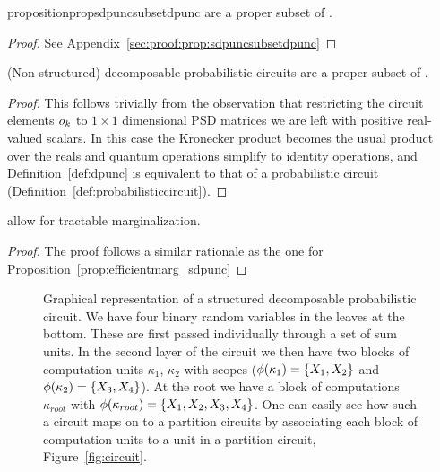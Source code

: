 \begin{restatable}{proposition}{propsdpuncsubsetdpunc}
	\label{prop:sdpuncsubsetdpunc}
	\sdpuncs are a proper subset of \dpuncs.
\end{restatable}

\begin{proof}
	See Appendix~\ref{sec:proof:prop:sdpuncsubsetdpunc}
\end{proof}





\begin{proposition}
	(Non-structured) decomposable probabilistic circuits are a proper subset of \dpuncs.
\end{proposition}

\begin{proof}
	This follows trivially from the observation that restricting the circuit elements $o_k$ to  $1{\times}1$ dimensional PSD matrices we are left with positive real-valued scalars. In this case the Kronecker product becomes the usual product over the reals and quantum operations simplify to identity operations, and Definition~\ref{def:dpunc} is equivalent to that of a probabilistic circuit (Definition~\ref{def:probabilisticcircuit}).
\end{proof}

\begin{proposition}
	\dpuncs allow for tractable marginalization.
\end{proposition}

\begin{proof}
	The proof follows a similar rationale as the one for Proposition~\ref{prop:efficientmarg_sdpunc}
\end{proof}




\begin{figure}
	\centering

	
	\caption{
		Graphical representation of a structured decomposable probabilistic circuit. We have four binary random variables in the leaves at the bottom. These are first passed individually through a set of sum units. In the second layer of the circuit we then have two blocks of computation units $\kappa_1$, $\kappa_2$ with scopes ($\phi(\kappa_1)= \{ X_1, X_2  \}$ and $\phi(\kappa_2)= \{ X_3, X_4  \}$). At the root we have a block of computations $\kappa_{root}$ with $\phi(\kappa_{root}) = \{ X_1, X_2, X_3, X_4 \}$. One can easily see how such a circuit maps on to a partition circuits by associating each block of computation units to a unit in a partition circuit, \cf Figure~\ref{fig:circuit}.
	}
	\label{fig:sdcircuit}
\end{figure}



